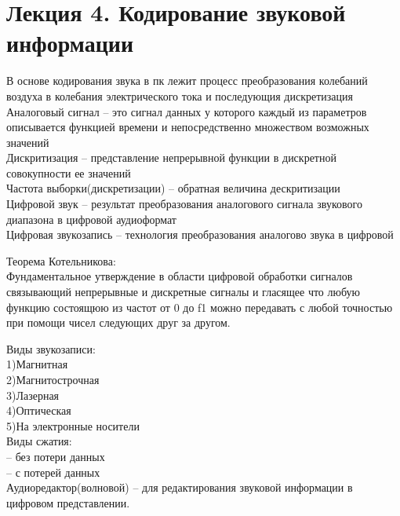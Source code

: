 \documentclass[a4paper, 12pt]{article}
\begin{document}
\section*{Лекция 4. Кодирование звуковой информации}

В основе кодирования звука в пк лежит процесс преобразования колебаний воздуха в колебания электрического тока и последующия дискретизация\\

Аналоговый сигнал -- это сигнал данных у которого каждый из параметров описывается функцией времени и непосредственно множеством возможных значений\\

Дискритизация -- представление непрерывной функции в дискретной совокупности ее значений\\

Частота выборки(дискретизации) -- обратная величина дескритизации\\

Цифровой звук -- результат преобразования аналогового сигнала звукового диапазона в цифровой аудиоформат\\

Цифровая звукозапись -- технология преобразования аналогово звука в цифровой\\

\begin{mdframed}[backgroundcolor=blue!20] 
       Теорема Котельникова:\\
       Фундаментальное утверждение в области цифровой обработки сигналов связывающий непрерывные и дискретные сигналы и гласящее что любую функцию состоящюю из частот от 0 до f1 можно передавать с любой точностью при помощи чисел следующих друг за другом.
    \end{mdframed}

Виды звукозаписи:\\
1)Магнитная \\
2)Магнитострочная\\
3)Лазерная\\
4)Оптическая\\
5)На электронные носители\\

Виды сжатия:\\
-- без потери данных\\
-- с потерей данных\\

Аудиоредактор(волновой) -- для редактирования звуковой информации в цифровом представлении.\\
\end{document}
